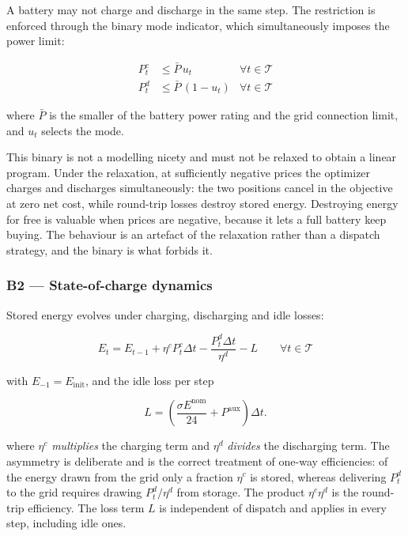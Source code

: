 \documentclass[11pt,a4paper]{article}
\numberwithin{equation}{section}
\begin{document}
A battery may not charge and discharge in the same step. The restriction is
enforced through the binary mode indicator, which simultaneously imposes the
power limit:

\begin{align}
P^{c}_{t} &\le \bar{P} \, u_{t} & \forall t \in \mathcal{T} \\
P^{d}_{t} &\le \bar{P} \, (1 - u_{t}) & \forall t \in \mathcal{T}
\end{align}

where $\bar{P}$ is the smaller of the battery power rating and the grid
connection limit, and $u_t$ selects the mode.

This binary is not a modelling nicety and must not be relaxed to obtain a linear
program. Under the relaxation, at sufficiently negative prices the optimizer
charges and discharges simultaneously: the two positions cancel in the objective
at zero net cost, while round-trip losses destroy stored energy. Destroying
energy for free is valuable when prices are negative, because it lets a full
battery keep buying. The behaviour is an artefact of the relaxation rather than
a dispatch strategy, and the binary is what forbids it.

\subsubsection*{B2 --- State-of-charge dynamics}

Stored energy evolves under charging, discharging and idle losses:

\begin{equation}
E_{t} = E_{t-1}
      + \eta^{c} P^{c}_{t} \Delta t
      - \frac{P^{d}_{t} \Delta t}{\eta^{d}}
      - L
      \qquad \forall t \in \mathcal{T}
\end{equation}

with $E_{-1} = E_{\text{init}}$, and the idle loss per step

\begin{equation}
L = \left( \frac{\sigma E^{\text{nom}}}{24} + P^{\text{aux}} \right) \Delta t .
\end{equation}

where $\eta^{c}$ \emph{multiplies} the charging term and $\eta^{d}$
\emph{divides} the discharging term. The asymmetry is deliberate and is the
correct treatment of one-way efficiencies: of the energy drawn from the grid
only a fraction $\eta^{c}$ is stored, whereas delivering $P^{d}_{t}$ to the grid
requires drawing $P^{d}_{t} / \eta^{d}$ from storage. The product
$\eta^{c} \eta^{d}$ is the round-trip efficiency. The loss term $L$ is
independent of dispatch and applies in every step, including idle ones.
\end{document}
